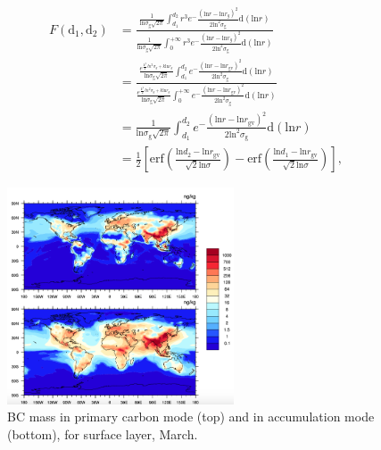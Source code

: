 \documentclass[11pt]{article}
\begin{document}
\begin{align*}
F(\text{d}_{1}, \text{d}_{2}) &= \frac{\frac{1}{\text{ln}\sigma_{\text{g}}\sqrt{2\pi}}\int_{d_{1}}^{d_{2}}r^3e^-\frac{(\text{ln}r - \text{ln}r_{g})^2}{2\text{ln}^2\sigma_{\text{g}}}\text{d}(\text{ln}r)}
{\frac{1}{\text{ln}\sigma_{\text{g}}\sqrt{2\pi}}\int_{0}^{+\infty}r^3e^-\frac{(\text{ln}r - \text{ln}r_{g})^2}{2\text{ln}^2\sigma_{\text{g}}}\text{d}(\text{ln}r)}  \\
&=\frac{\frac{e^{\frac{k^2}{2}ln^2\sigma_{g}+k\text{ln}r_{g}}}{\text{ln}\sigma_{\text{g}}\sqrt{2\pi}}\int_{d_{1}}^{d_{2}}e^-\frac{(\text{ln}r - \text{ln}r_{\text{gv}})^2}{2\text{ln}^2\sigma_{\text{g}}}\text{d}(\text{ln}r)}{\frac{e^{\frac{k^2}{2}ln^2\sigma_{g}+k\text{ln}r_{g}}}{\text{ln}\sigma_{\text{g}}\sqrt{2\pi}}\int_{0}^{+\infty}e^-\frac{(\text{ln}r - \text{ln}r_{\text{gv}})^2}{2\text{ln}^2\sigma_{\text{g}}}\text{d}(\text{ln}r)}\\
&=\frac{1}{\text{ln}\sigma_{\text{g}}\sqrt{2\pi}}\int_{d_{1}}^{d_{2}}e^-\frac{(\text{ln}r - \text{ln}r_{\text{gv}})^2}{2\text{ln}^2\sigma_{\text{g}}}\text{d}(\text{ln}r) \\
&=\frac{1}{2}[\text{erf}(\frac{\text{ln}d_{2} - \text{ln}r_{\text{gv}}}{\sqrt{2}\text{ln}\sigma})-\text{erf}(\frac{\text{ln}d_{1} - \text{ln}r_{\text{gv}}}{\sqrt{2}\text{ln}\sigma})],
\end{align*}




\bigskip
\bigskip
\bigskip
\begin{figure}[!h] 
	\begin{center}
		\includegraphics[width = 0.6\textwidth]{Rplot01}
		\caption[]{\label{fig_P1}BC mass in primary carbon mode (top) and in accumulation mode (bottom), for surface layer, March.}
	\end{center}
\end{figure}
\end{document}
